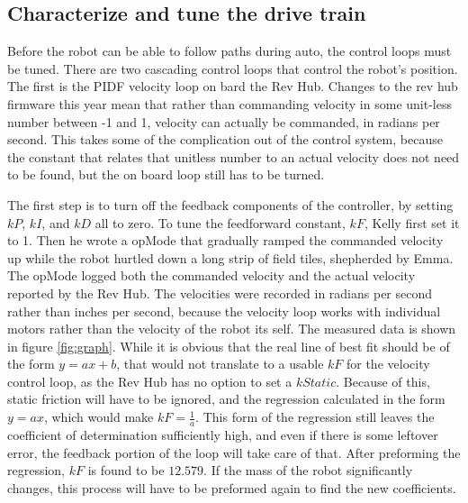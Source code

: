 \documentclass{article}
\begin{document}
\subsection {Characterize and tune the drive train}

Before the robot can be able to follow paths during auto, the control loops must be tuned. There are two cascading control loops that control the robot's position. The first is the PIDF velocity loop on bard the Rev Hub. Changes to the rev hub firmware this year mean that rather than commanding velocity in some unit-less number between -1 and 1, velocity can actually be commanded, in radians per second. This takes some of the complication out of the control system, because the constant that relates that unitless number to an actual velocity does not need to be found, but the on board loop still has to be turned. 

The first step is to turn off the feedback components of the controller, by setting $kP$, $kI$, and $kD$ all to zero. To tune the feedforward constant, $kF$, Kelly first set it to 1. Then he wrote a opMode that gradually ramped the commanded velocity up while the robot hurtled down a long strip of field tiles, shepherded by Emma. The opMode logged both the commanded velocity and the actual velocity reported by the Rev Hub. The velocities were recorded in radians per second rather than inches per second, because the velocity loop works with individual motors rather than the velocity of the robot its self. The measured data is shown in figure \ref{fig:graph}. While it is obvious that the real line of best fit should be of the form $y=ax+b$, that would not translate to a usable $kF$ for the velocity control loop, as the Rev Hub has no option to set a $kStatic$. Because of this, static friction will have to be ignored, and the regression calculated in the form $y=ax$, which would make $kF = \frac{1}{a}$. This form of the regression still leaves the coefficient of determination sufficiently high, and even if there is some leftover error, the feedback portion of the loop will take care of that. After preforming the regression, $kF$ is found to be $12.579$. If the mass of the robot significantly changes, this process will have to be preformed again to find the new coefficients.
\end{document}
